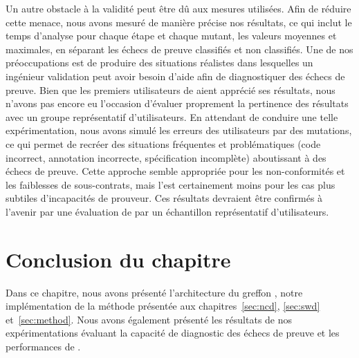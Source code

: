 Un autre obstacle à la validité peut être dû aux mesures utilisées.
Afin de réduire cette menace, nous avons mesuré de manière précise nos
résultats, ce qui inclut le temps d'analyse pour chaque étape et chaque mutant,
les valeurs moyennes et maximales, en séparant les échecs de preuve classifiés
et non classifiés.
Une de nos préoccupations est de produire des situations réalistes dans
lesquelles un ingénieur validation peut avoir besoin d'aide afin de
diagnostiquer des échecs de preuve.
Bien que les premiers utilisateurs de \stady aient apprécié ses résultats, nous
n'avons pas encore eu l'occasion d'évaluer proprement la pertinence des
résultats avec un groupe représentatif d'utilisateurs.
En attendant de conduire une telle expérimentation, nous avons simulé les
erreurs des utilisateurs par des mutations, ce qui permet de recréer des
situations fréquentes et problématiques (code incorrect, annotation incorrecte,
spécification incomplète) aboutissant à des échecs de preuve.
Cette approche semble appropriée pour les non-conformités et les faiblesses de
sous-contrats, mais l'est certainement moins pour les cas plus subtiles
d'incapacités de prouveur.
Ces résultats devraient être confirmés à l'avenir par une évaluation de \stady
par un échantillon représentatif d'utilisateurs.


\section*{Conclusion du chapitre}


Dans ce chapitre, nous avons présenté l'architecture du greffon \stady, notre
implémentation de la méthode présentée aux chapitres~\ref{sec:ncd},
\ref{sec:swd} et~\ref{sec:method}.
Nous avons également présenté les résultats de nos expérimentations évaluant
la capacité de diagnostic des échecs de preuve et les performances de \stady.

